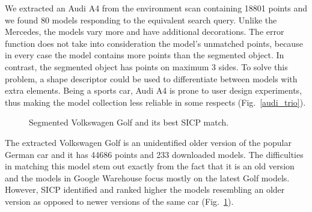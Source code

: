 \documentclass{llncs}
\begin{document}
We extracted an Audi A4 from the environment scan containing 18801
points and we found 80 models responding to the equivalent search
query. Unlike the Mercedes, the models vary more and have additional
decorations. The error function does not take into consideration the
model's unmatched points, because in every case the model contains
more points than the segmented object. In contrast, the segmented
object has points on maximum 3 sides. To solve this problem, a shape
descriptor could be used to differentiate between models with extra
elements. Being a sports car, Audi A4 is prone to user design
experiments, thus making the model collection less reliable in some
respects (Fig.~\ref{audi_trio}).

  \begin{figure}
    \centering
    \hspace{3 mm}
    \hspace{3 mm}
    \caption{Segmented Volkswagen Golf and its best SICP match.}
    \label{golf_trio}
  \end{figure}

The extracted Volkswagen Golf is an unidentified older version of the
popular German car and it has 44686 points and 233 downloaded
models. The difficulties in matching this model stem out exactly from
the fact that it is an old version and the models in Google Warehouse
focus mostly on the latest Golf models. However, SICP identified and
ranked higher the models resembling an older version as opposed to
newer versions of the same car (Fig.~\ref{golf_trio}).
 
\end{document}
